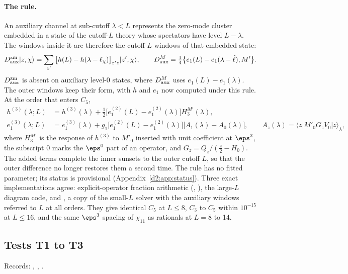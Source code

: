 \paragraph{The rule.} An auxiliary channel at sub-cutoff $\lambda<L$ represents the zero-mode cluster embedded in a state of
the cutoff-$L$ theory whose spectators have level $L-\lambda$. The windows inside it are therefore the cutoff-$L$ windows of
that embedded state:
\begin{equation}
 D^{\rm zm}_{\rm aux}|z,\chi\rangle=\sum_{z'}\big[h(L)-h(\lambda-\ell_\chi)\big]_{z'z}|z',\chi\rangle,\qquad
 D^M_{\rm aux}=\tfrac14\big\{e_1(L)-e_1(\lambda-\hat\ell),M'\big\}.
\end{equation}
$D^{\rm zm}_{\rm aux}$ is absent on auxiliary level-0 states, where $D^M_{\rm aux}$ uses $e_1(L)-e_1(\lambda)$. The outer
windows keep their form, with $h$ and $e_1$ now computed under this rule. At the order that enters $C_5$,
\begin{align}
 h^{(3)}(\lambda;L)&=h^{(3)}(\lambda)+\tfrac12\big[e_1^{(2)}(L)-e_1^{(2)}(\lambda)\big]H_3^{M'}(\lambda),\nonumber\\
 e_1^{(3)}(\lambda;L)&=e_1^{(3)}(\lambda)+g_1\big[e_1^{(2)}(L)-e_1^{(2)}(\lambda)\big]\big[A_1(\lambda)-A_0(\lambda)\big],\qquad
 A_z(\lambda)=\langle z|M'_0G_zV_0|z\rangle_\lambda ,
\end{align}
where $H_3^{M'}$ is the response of $h^{(3)}$ to $M'_0$ inserted with unit coefficient at $\eps^2$, the subscript 0 marks the
$\eps^0$ part of an operator, and $G_z=Q_z/(\frac z2-H_0)$. The added terms complete the inner sunsets to the outer cutoff
$L$, so that the outer difference no longer restores them a second time. The rule has no fitted parameter; its status is provisional (Appendix~\ref{d2:app:status}). Three exact
implementations agree: explicit-operator fraction arithmetic (, ), the large-$L$
diagram code, and , a copy of the small-$L$ solver with the auxiliary windows referred to $L$ at all orders.
They give identical $C_5$ at $L\le8$, $C_3$ to $C_5$ within $10^{-15}$ at $L\le16$, and the same $\eps^3$ spacing of
$\chi_{11}$ as rationals at $L=8$ to 14.

\subsection{Tests T1 to T3}\label{d2:app:tests}
{\small\raggedright\noindent Records: , ,
.\par}

